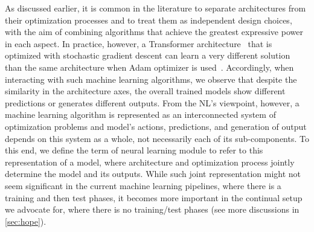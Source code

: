 \documentclass{article}
\newcommand{\citep}{\parencite}
\begin{document}
As discussed earlier, it is common in the literature to separate architectures from their optimization processes and to treat them as independent design choices, with the aim of combining algorithms that achieve the greatest expressive power in each aspect. In practice, however, a Transformer architecture~\citep{transformers} that is optimized with stochastic gradient descent can learn  a very different solution than the same architecture when  Adam optimizer is used~\citep{kingma2014adam}. Accordingly, when interacting with such machine learning algorithms, we observe that despite the similarity in the architecture axes, the overall trained models show different predictions or generates different outputs. From the NL's viewpoint, however, a machine learning algorithm is represented as an interconnected system of optimization problems and model's actions, predictions, and generation of output depends on this system as a whole, not necessarily each of its sub-components. To this end, we define the term of neural learning module to refer to this representation of a model, where architecture and optimization process jointly determine the model and its outputs. While such joint representation might not seem significant in the current machine learning pipelines, where there is a training and then test phases, it becomes more important in the continual setup we advocate for, where there is no training/test phases (see more discussions in \autoref{sec:hope}).   
\end{document}
